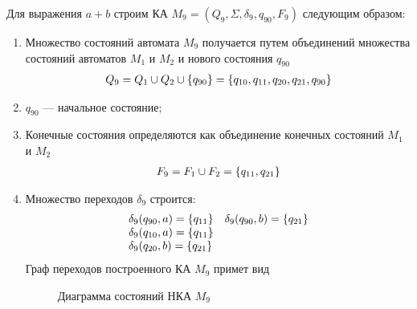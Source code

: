 \newpage
Для выражения \(a+b\) строим КА \(M_9 = (Q_9, \Sigma, \delta_9, q_{90}, F_9)\) следующим образом:
\begin{enumerate}
	\item Множество состояний автомата \(M_9\) получается путем объединений множества состояний автоматов \(M_1\) и \(M_2\) и нового состояния \(q_{90}\)
	      \begin{align*}
		      Q_9 = Q_1 \cup Q_2 \cup \left\{q_{90}\right\} = \left\{q_{10}, q_{11}, q_{20}, q_{21}, q_{90}\right\}
	      \end{align*}
	\item \(q_{90}\) --- начальное состояние;
	\item Конечные состояния определяются как объединение конечных состояний \(M_1\) и \(M_2\)
	      \begin{align*}
		      F_{9} = F_{1} \cup F_{2} = \left\{q_{11}, q_{21}\right\}
	      \end{align*}
	\item Множество переходов \(\delta_9\) строится:
	      \begin{align*}
		      \begin{array}{ll}
			      \delta_9(q_{90}, a) = \left\{q_{11}\right\} & \delta_9(q_{90}, b) = \left\{q_{21}\right\} \\
			      \delta_9(q_{10}, a) = \left\{q_{11}\right\}                                      \\
			      \delta_9(q_{20}, b) = \left\{q_{21}\right\}
		      \end{array}
	      \end{align*}
	      Граф переходов построенного КА \(M_9\) примет вид
	      \begin{figure}[h!]
		      \centering
		      \caption{Диаграмма состояний НКА \(M_9\)}
	      \end{figure}
\end{enumerate}
